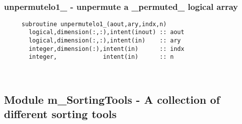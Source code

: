  
\mbox{}\hrulefill\ 
 

  \subsubsection{unpermutelo1\_ - unpermute a \_permuted\_ logical array}

\begin{verbatim} 
     subroutine unpermutelo1_(aout,ary,indx,n)
       logical,dimension(:,:),intent(inout) :: aout
       logical,dimension(:,:),intent(in)    :: ary
       integer,dimension(:),intent(in)      :: indx
       integer,             intent(in)      :: n
 \end{verbatim}%


 
\mbox{}\hrulefill\ 

  \subsection{Module m\_SortingTools - A collection of different sorting tools }
%
%  
%  
%  
  
